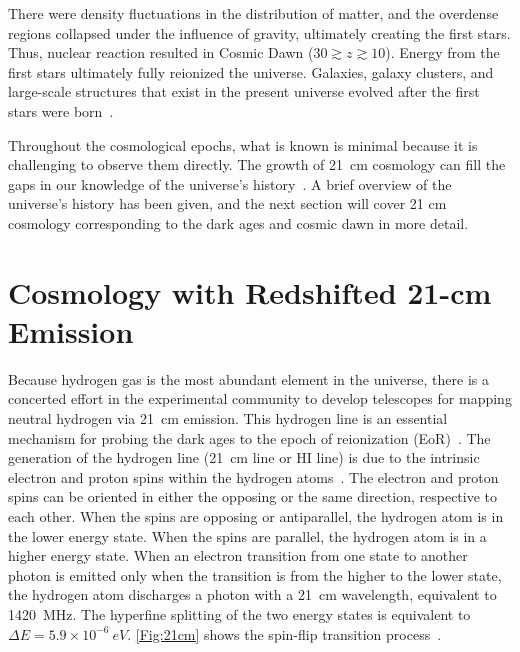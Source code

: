 There were density fluctuations in the distribution of matter, and the overdense regions collapsed under the influence of gravity, ultimately creating the first stars. Thus, nuclear reaction resulted in Cosmic Dawn ($30\gtrsim z \gtrsim 10$). Energy from the first stars ultimately fully reionized the universe. Galaxies, galaxy clusters, and large-scale structures that exist in the present universe evolved after the first stars were born~\citep{2017arXiv170808521D, 2012AdSpR..49..433B}. 

Throughout the cosmological epochs, what is known is minimal because it is challenging to observe them directly. The growth of \SI{21}{cm} cosmology can fill the gaps in our knowledge of the universe's history~\citep{2012RPPh...75h6901P}. A brief overview of the universe's history has been given, and the next section will cover 21 cm cosmology corresponding to the dark ages and cosmic dawn in more detail.

\section{Cosmology with Redshifted 21-cm Emission}

Because hydrogen gas is the most abundant element in the universe, there is a concerted effort in the experimental community to develop telescopes for mapping neutral hydrogen via \SI{21}{cm} emission. This hydrogen line is an essential mechanism for probing the dark ages to the epoch of reionization (EoR)~\citep{2013PhRvD..87d3002L,2014ApJ...782...66P}. The generation of the hydrogen line (\SI{21}{cm} line or HI line) is due to the intrinsic electron and proton spins within the hydrogen atoms~\citep{book:832129}. The electron and proton spins can be oriented in either the opposing or the same direction, respective to each other. When the spins are opposing or antiparallel, the hydrogen atom is in the lower energy state. When the spins are parallel, the hydrogen atom is in a higher energy state. When an electron transition from one state to another photon is emitted only when the transition is from the higher to the lower state, the hydrogen atom discharges a photon with a \SI{21}{cm} wavelength, equivalent to \SI{1420}{MHz}. The hyperfine splitting of the two energy states is equivalent to \(\Delta E =  5.9 \times 10^{-6} \ eV\). \autoref{Fig:21cm} shows the spin-flip transition process~\citep{16, book:832129}.

